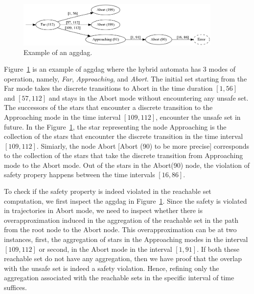 \begin{figure}
\centering
\includegraphics[width=0.9\textwidth]{images/viz2}
\caption{Example of an aggdag.}
\label{fig:aggdagex1}
\end{figure}

\begin{example}
Figure~\ref{fig:aggdagex1} is an example of aggdag where the hybrid automata has 3 modes of operation, namely, {\em Far}, {\em Approaching}, and {\em Abort}. The initial set starting from the Far mode takes the discrete transitions to Abort in the time duration $[1,56]$ and $[57,112]$ and stays in the Abort mode without encountering any unsafe set. The successors of the stars that encounter a discrete transition to the Approaching mode in the time interval $[109,112]$, encounter the unsafe set in future. In the Figure~\ref{fig:aggdagex1}, the star representing the node Approaching is the collection of the stars that encounter the discrete transition in the time interval $[109, 112]$. Simiarly, the node Abort [Abort (90) to be more precise] corresponds to the collection of the stars that take the discrete transition from Approaching mode to the Abort mode. Out of the stars in the Abort(90) node, the violation of safety propery happens between the time intervals $[16,86]$.
\end{example}

To check if the safety property is indeed violated in the reachable set computation, we first inspect the aggdag in Figure~\ref{fig:aggdagex1}. Since the safety is violated in trajectories in Abort mode, we need to inspect whether there is overapproximation induced in the aggregation of the reachable set in the path from the root node to the Abort node. 
This overapproximation can be at two instances, first, the aggregation of stars in the Approaching modes in the interval $[109, 112]$ or second, in the Abort mode in the interval $[1,91]$.  If both these reachable set do not have any aggregation, then we have proof that the overlap with the unsafe set is indeed a safety violation. Hence, refining only the aggregation associated with the reachable sets in the specific interval of time suffices.


